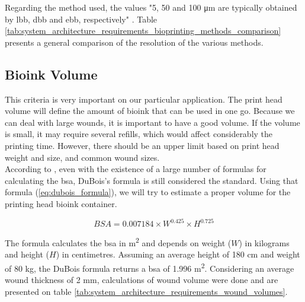 Regarding the method used, the values "5, 50 and 100 \si{\micro\meter} are typically obtained by \gls{lbb}, \gls{dbb} and \gls{ebb}, respectively" \cite{Datta2018_essential_steps_bioprinting}. Table \ref{tab:system_architecture_requirements_bioprinting_methods_comparison} presents a general comparison of the resolution of the various methods.


\subsection{Bioink Volume}
\label{subsec:system_architecture_requirements_bioprinting_bioink_volume}

This criteria is very important on our particular application. The print head volume will define the amount of bioink that can be used in one go. Because we can deal with large wounds, it is important to have a good volume. If the volume is small, it may require several refills, which would affect considerably the printing time. However, there should be an upper limit based on print head weight and size, and common wound sizes.\\

According to \citeauthor{Redlarski2016_bsa_formulae_alarming_ambiguity} \cite{Redlarski2016_bsa_formulae_alarming_ambiguity}, even with the existence of a large number of formulas for calculating the \gls{bsa}, DuBois's formula \cite{DuBOIS1916_formula} is still considered the standard. Using that formula (\ref{eq:dubois_formula}), we will try to estimate a proper volume for the printing head bioink container.

\begin{equation}
\label{eq:dubois_formula}
    BSA = 0.007184 \times W^{0.425} \times H^{0.725}
\end{equation}

The formula calculates the \gls{bsa} in \si{\meter\squared} and depends on weight ($W$) in kilograms and height ($H$) in centimetres. Assuming an average height of 180 cm and weight of 80 kg, the DuBois formula returns a \gls{bsa} of 1.996 \si{\meter\squared}. Considering an average wound thickness of 2 \si{\milli\meter}, calculations of wound volume were done and are presented on table \ref{tab:system_architecture_requirements_wound_volumes}.

